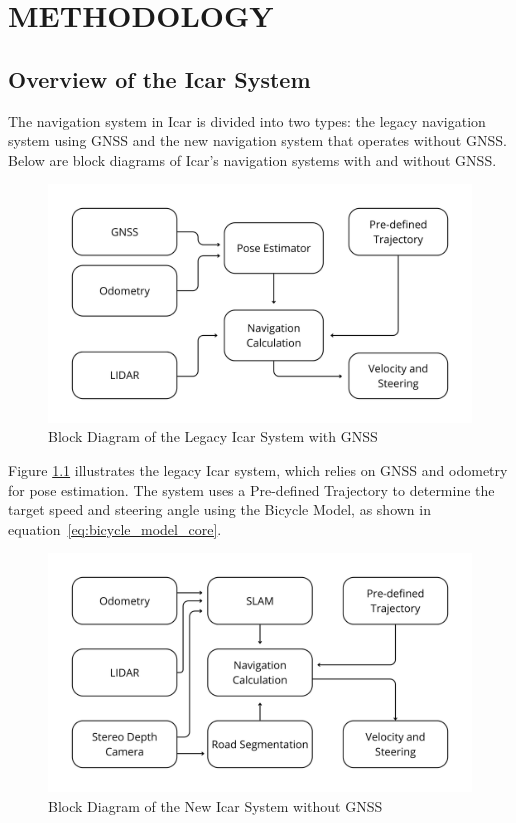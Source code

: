 \chapter{METHODOLOGY}
\label{sec:chap3_metodologi}

\section*{ }
\section{Overview of the Icar System} 
The navigation system in Icar is divided into two types: the legacy navigation system using GNSS and the new navigation system that operates without GNSS. Below are block diagrams of Icar's navigation systems with and without GNSS.

\begin{figure}[H]
	\centering
	\includegraphics[width=\linewidth]{../konten/full_sys1.png}
	\caption{Block Diagram of the Legacy Icar System with GNSS}
	\label{fig:full_system}
\end{figure}
\FloatBarrier

Figure \ref{fig:full_system} illustrates the legacy Icar system, which relies on GNSS and odometry for pose estimation. The system uses a Pre-defined Trajectory to determine the target speed and steering angle using the Bicycle Model, as shown in equation~\ref{eq:bicycle_model_core}.

\begin{figure}[H]
	\centering
	\includegraphics[width=\linewidth]{../konten/full_sys_slam1.png}
	\caption{Block Diagram of the New Icar System without GNSS}
	\label{fig:full_system_slam}
\end{figure}

